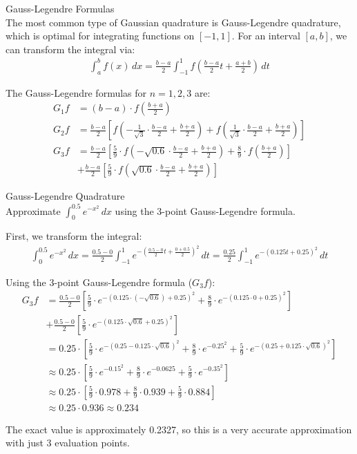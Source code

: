 \begin{definition}{Gauss-Legendre Formulas}\\
The most common type of Gaussian quadrature is Gauss-Legendre quadrature, which is optimal for integrating functions on $[-1,1]$. For an interval $[a,b]$, we can transform the integral via:
\begin{align*}
\int_a^b f(x) \, dx = \frac{b-a}{2}\int_{-1}^{1} f\left(\frac{b-a}{2}t + \frac{a+b}{2}\right) \, dt
\end{align*}

The Gauss-Legendre formulas for $n=1, 2, 3$ are:
\begin{align*}
G_1f &= (b-a) \cdot f\left(\frac{b+a}{2}\right)\\
G_2f &= \frac{b-a}{2}\left[f\left(-\frac{1}{\sqrt{3}}\cdot\frac{b-a}{2} + \frac{b+a}{2}\right) + f\left(\frac{1}{\sqrt{3}}\cdot\frac{b-a}{2} + \frac{b+a}{2}\right)\right]\\
G_3f &= \frac{b-a}{2}\left[\frac{5}{9}\cdot f\left(-\sqrt{0.6}\cdot\frac{b-a}{2} + \frac{b+a}{2}\right) + \frac{8}{9}\cdot f\left(\frac{b+a}{2}\right)\right]\\
&+ \frac{b-a}{2}\left[\frac{5}{9}\cdot f\left(\sqrt{0.6}\cdot\frac{b-a}{2} + \frac{b+a}{2}\right)\right]
\end{align*}
\end{definition}

\begin{example2}{Gauss-Legendre Quadrature}\\
Approximate $\int_0^{0.5} e^{-x^2} \, dx$ using the 3-point Gauss-Legendre formula.

First, we transform the integral:
\begin{align*}
\int_0^{0.5} e^{-x^2} \, dx = \frac{0.5-0}{2}\int_{-1}^{1} e^{-\left(\frac{0.5-0}{2}t + \frac{0+0.5}{2}\right)^2} \, dt = \frac{0.25}{2}\int_{-1}^{1} e^{-\left(0.125t + 0.25\right)^2} \, dt
\end{align*}

Using the 3-point Gauss-Legendre formula ($G_3f$):
\begin{align*}
G_3f &= \frac{0.5-0}{2}\left[\frac{5}{9}\cdot e^{-\left(0.125\cdot(-\sqrt{0.6}) + 0.25\right)^2} + \frac{8}{9}\cdot e^{-\left(0.125\cdot 0 + 0.25\right)^2}\right]\\
&+ \frac{0.5-0}{2}\left[\frac{5}{9}\cdot e^{-\left(0.125\cdot\sqrt{0.6} + 0.25\right)^2}\right]\\
&= 0.25 \cdot \left[\frac{5}{9}\cdot e^{-\left(0.25-0.125\cdot\sqrt{0.6}\right)^2} + \frac{8}{9}\cdot e^{-0.25^2} + \frac{5}{9}\cdot e^{-\left(0.25+0.125\cdot\sqrt{0.6}\right)^2}\right]\\
&\approx 0.25 \cdot \left[\frac{5}{9}\cdot e^{-0.15^2} + \frac{8}{9}\cdot e^{-0.0625} + \frac{5}{9}\cdot e^{-0.35^2}\right]\\
&\approx 0.25 \cdot \left[\frac{5}{9}\cdot 0.978 + \frac{8}{9}\cdot 0.939 + \frac{5}{9}\cdot 0.884\right]\\
&\approx 0.25 \cdot 0.936 \approx 0.234
\end{align*}

The exact value is approximately 0.2327, so this is a very accurate approximation with just 3 evaluation points.
\end{example2}

